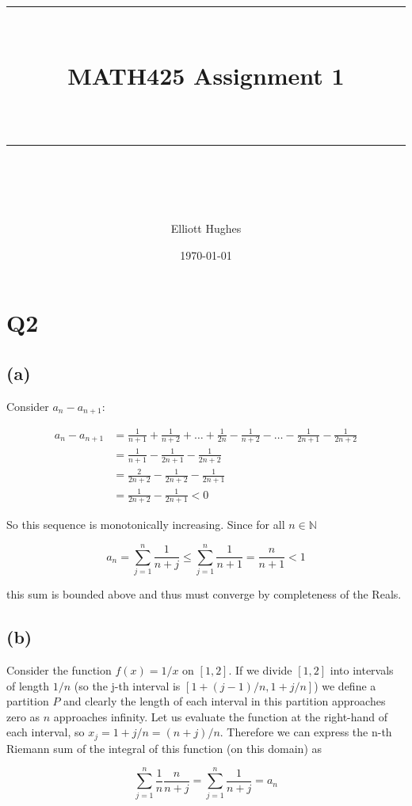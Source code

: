 \documentclass{article}
\title{	
	\normalfont\normalsize 
	\rule{\linewidth}{0.5pt}\\ %
	\vspace{14pt} %
	{\LARGE MATH425 Assignment 1\\ %
    \large \textit{} \\}
	\vspace{6pt} %
	\rule{\linewidth}{1pt}\\ %
}
\author{Elliott Hughes}
\date{\normalsize\today}
\begin{document}
\maketitle

\section*{Q2}
\subsection*{(a)}
Consider $a_n - a_{n+1}$:

\begin{align*}
    a_n - a_{n+1} &= \frac{1}{n+1} + \frac{1}{n+2} + \dots + \frac{1}{2n} - \frac{1}{n+2} - \dots - \frac{1}{2n+1} - \frac{1}{2n+2} \\
    &= \frac{1}{n+1} - \frac{1}{2n+1} - \frac{1}{2n+2} \\
    &= \frac{2}{2n+2} - \frac{1}{2n+2} - \frac{1}{2n+1} \\
    &= \frac{1}{2n+2} - \frac{1}{2n+1} < 0
\end{align*}

So this sequence is monotonically increasing. Since for all $n \in \mathbb{N}$

\begin{equation*}
    a_n = \sum_{j=1}^n \frac{1}{n+j} \leq \sum_{j=1}^n \frac{1}{n+1} = \frac{n}{n+1} < 1
\end{equation*}

this sum is bounded above and thus must converge by completeness of the Reals.

\subsection*{(b)}
Consider the function $f(x) = 1/x$ on $[1,2]$. If we divide $[1,2]$ into intervals of length $1/n$ 
(so the j-th interval is $[1 + (j-1)/n,1 + j/n]$) we define a partition $P$ and clearly the length 
of each interval in this partition approaches zero as $n$ approaches infinity. Let us evaluate the 
function at the right-hand of each interval, so $x_j = 1 + j/n = (n+j)/n$. Therefore we can express 
the n-th Riemann sum of the integral of this function (on this domain) as 

\begin{equation*}
    \sum^n_{j=1}\frac{1}{n}\frac{n}{n+j} = \sum^n_{j=1}\frac{1}{n+j} = a_n
\end{equation*}
\end{document}
